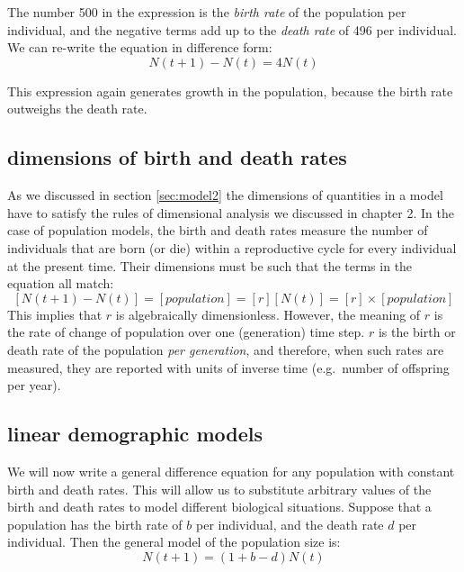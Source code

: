 \documentclass[
  letterpaper,
  DIV=11,
  numbers=noendperiod]{scrreprt}
\begin{document}
The number 500 in the expression is the 
\emph{birth rate} of the population per individual, and the negative
terms add up to the  \emph{death rate} of
496 per individual. We can re-write the equation in difference form: \[ 
N(t+1) - N(t) = 4N(t)
\]

This expression again generates growth in the population, because the
birth rate outweighs the death rate. \cite{allman_mathematical_2003}

\hypertarget{dimensions-of-birth-and-death-rates}{%
\subsection{dimensions of birth and death
rates}\label{dimensions-of-birth-and-death-rates}}

As we discussed in section \ref{sec:model2} the dimensions of quantities
in a model have to satisfy the rules of 
dimensional analysis we discussed in chapter 2. In the case of
population models, the birth and death rates measure the number of
individuals that are born (or die) within a reproductive cycle for every
individual at the present time. Their dimensions must be such that the
terms in the equation all match:
\[ [N(t+1) - N(t)] = [population] = [r] [N(t)] = [r]  \times [population] \]
This implies that \(r\) is algebraically dimensionless. However, the
meaning of \(r\) is the rate of change of population over one
(generation) time step. \(r\) is the birth or death rate of the
population \emph{per generation}, and therefore, when such rates are
measured, they are reported with units of inverse time (e.g.~number of
offspring per year).

\hypertarget{linear-demographic-models}{%
\subsection{linear demographic models}\label{linear-demographic-models}}

We will now write a general difference equation for any population with
constant birth and death rates. This will allow us to substitute
arbitrary values of the birth and death rates to model different
biological situations. Suppose that a population has the birth rate of
\(b\) per individual, and the death rate \(d\) per individual. Then the
general model of the population size is: \begin{equation}
 N(t+1) = (1 + b - d)N(t)
 \label{linear_pop}
\end{equation}
\end{document}
